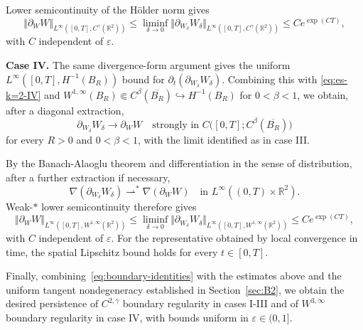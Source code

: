 \documentclass[reqno,11pt,a4paper]{amsart}
\begin{document}
Lower semicontinuity of the H\"older norm gives
\[
  \Vert \partial_WW\Vert _{L^\infty([0,T],C^\gamma(\mathbb R^2))}
  \leq
  \liminf_{\delta\to0}
  \Vert \partial_{W_\delta}W_\delta\Vert _
    {L^\infty([0,T],C^\gamma(\mathbb R^2))}
  \leq Ce^{\exp(CT)},
\]
with $C$ independent of $\varepsilon$.

\medskip
\noindent\textbf{Case IV.}
The same divergence-form argument gives the uniform
$L^\infty([0,T],H^{-1}(B_R))$ bound for
$\partial_t(\partial_{W_\delta}W_\delta)$.
Combining this with \eqref{eq:es-k=2-IV} and  $W^{1,\infty}(B_R)
  \Subset C^\beta(\overline{B_R})
  \hookrightarrow H^{-1}(B_R)$ for $0<\beta<1$, 
we obtain, after a diagonal extraction,
\[
  \partial_{W_\delta}W_\delta
  \longrightarrow\partial_WW
  \quad\text{strongly in }
  C\bigl([0,T];C^\beta(\overline{B_R})\bigr)
\]
for every $R>0$ and $0<\beta<1$,
with the limit identified as in case III.

By the Banach-Alaoglu theorem and 
differentiation in the sense of distribution, after a further extraction if necessary,
\[
  \nabla(\partial_{W_\delta}W_\delta)
  \rightharpoonup^\ast\nabla(\partial_WW)
  \quad\text{in }
  L^\infty((0,T)\times\mathbb R^2).
\]
Weak-$\ast$ lower semicontinuity therefore gives
\[
  \Vert \partial_WW\Vert _{L^\infty([0,T],W^{1,\infty}(\mathbb R^2))}
  \leq
  \liminf_{\delta\to0}
  \Vert \partial_{W_\delta}W_\delta\Vert _
    {L^\infty([0,T],W^{1,\infty}(\mathbb R^2))}
  \leq Ce^{\exp(CT)},
\]
with $C$ independent of $\varepsilon$.
For the representative obtained by local convergence
in time, the spatial Lipschitz bound holds
for every $t\in[0,T]$.


Finally, combining~\eqref{eq:boundary-identities} with the
estimates above and the uniform tangent nondegeneracy established
in Section~\ref{sec:B2}, we obtain the desired persistence of
$C^{2,\gamma}$ boundary regularity in cases I-III and of
$W^{3,\infty}$ boundary regularity in case IV, with bounds
uniform in $\varepsilon\in(0,1]$.
\end{document}
